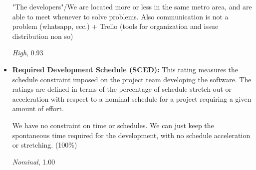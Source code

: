 \documentclass[english]{article}
\begin{document}
\begin{itemize}
"The developers"/We are located more or less in the same metro area, and are able to meet whenever to solve problems.
Also communication is not a problem (whatsapp, ecc.)
+ Trello (tools for organization and issue distribution non so)

\textit{High}, 0.93

\item \textbf{Required Development Schedule (SCED):} This rating measures the schedule constraint imposed on the project team developing the software. The ratings are defined in terms of the percentage of schedule stretch-out or acceleration with respect to a nominal schedule for a project requiring a given amount of effort.

We have no constraint on time or schedules. We can just keep the spontaneous time required for the development, with no schedule acceleration or stretching. (100\%)

\textit{Nominal}, 1.00


\end{itemize}
\end{document}
